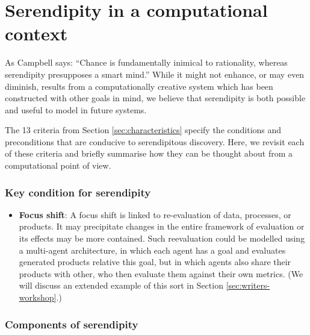 \section{Serendipity in a computational context} \label{sec:computational-serendipity}

As Campbell \citeyear{campbell} says: ``Chance is fundamentally
inimical to rationality, whereas serendipity presupposes a smart
mind.''  While it might not enhance, or may even diminish, results
from a computationally creative system which has been constructed with
other goals in mind, we believe that serendipity is both possible and
useful to model in future systems.


The 13 criteria from Section \ref{sec:characteristics}
specify the conditions and preconditions that are conducive to
serendipitous discovery.  Here, we revisit each of these criteria and
briefly summarise how they can be thought about from a computational
point of view.

\subsubsection*{Key condition for serendipity}

\begin{itemize}
\item \textbf{Focus shift}: A focus shift is linked to re-evaluation
  of data, processes, or products.  It may precipitate changes in the
  entire framework of evaluation or its effects may be more contained.
  Such reevaluation could be modelled using a multi-agent
  architecture, in which each agent has a goal and evaluates generated
  products relative this goal, but in which agents also share their
  products with other, who then evaluate them against their own
  metrics.  (We will discuss an extended example of this sort in
  Section \ref{sec:writers-workshop}.)
\end{itemize}

\subsubsection*{Components of serendipity}

